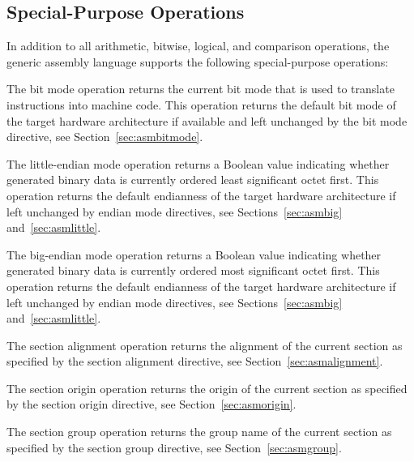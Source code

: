 \subsection{Special-Purpose Operations}\label{sec:asmspecialpurposeoperations}

In addition to all arithmetic, bitwise, logical, and comparison operations, the generic assembly language supports the following special-purpose operations:

\begin{itemize}


The bit mode operation returns the current bit mode that is used to translate instructions into machine code.
This operation returns the default bit mode of the target hardware architecture if available and left unchanged by the bit mode directive, see Section~\ref{sec:asmbitmode}.


The little-endian mode operation returns a Boolean value indicating whether generated binary data is currently ordered least significant octet first.
This operation returns the default endianness of the target hardware architecture if left unchanged by endian mode directives, see Sections~\ref{sec:asmbig} and~\ref{sec:asmlittle}.


The big-endian mode operation returns a Boolean value indicating whether generated binary data is currently ordered most significant octet first.
This operation returns the default endianness of the target hardware architecture if left unchanged by endian mode directives, see Sections~\ref{sec:asmbig} and~\ref{sec:asmlittle}.


The section alignment operation returns the alignment of the current section as specified by the section alignment directive, see Section~\ref{sec:asmalignment}.


The section origin operation returns the origin of the current section as specified by the section origin directive, see Section~\ref{sec:asmorigin}.


The section group operation returns the group name of the current section as specified by the section group directive, see Section~\ref{sec:asmgroup}.


\end{itemize}
